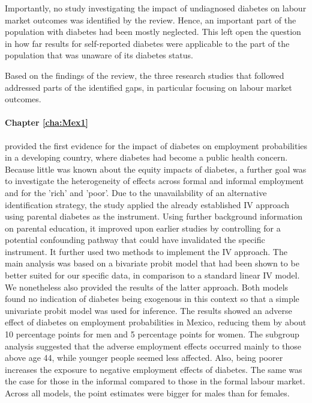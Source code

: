 Importantly, no study investigating the impact of undiagnosed diabetes on labour market outcomes was identified by the review. Hence, an important part of the population with diabetes had been mostly neglected. This left open the question in how far results for self-reported diabetes were applicable to the part of the population that was unaware of its diabetes status.

Based on the findings of the review, the three research studies that followed addressed parts of the identified gaps, in particular focusing on labour market outcomes. 

\paragraph{Chapter \ref{cha:Mex1}} provided the first evidence for the impact of diabetes on employment probabilities in a developing country, where diabetes had become a public health concern. Because little was known about the equity impacts of diabetes, a further goal was to investigate the heterogeneity of effects across formal and informal employment and for the 'rich' and 'poor'. Due to the unavailability of an alternative identification strategy, the study applied the already established \ac{IV} approach using parental diabetes as the instrument. Using further background information on parental education, it improved upon earlier studies by controlling for a potential confounding pathway that could have invalidated the specific instrument. It further used two methods to implement the \ac{IV} approach. The main analysis was based on a bivariate probit model that had been shown to be better suited for our specific data, in comparison to a standard linear \ac{IV} model. We nonetheless also provided the results of the latter approach. Both models found no indication of diabetes being exogenous in this context so that a simple univariate probit model was used for inference. The results showed an adverse effect of diabetes on employment probabilities in Mexico, reducing them by about 10 percentage points for men and 5 percentage points for women. The subgroup analysis suggested that the adverse employment effects occurred mainly to those above age 44, while younger people seemed less affected. Also, being poorer increases the exposure to negative employment effects of diabetes. The same was the case for those in the informal compared to those in the formal labour market. Across all models, the point estimates were bigger for males than for females. 

